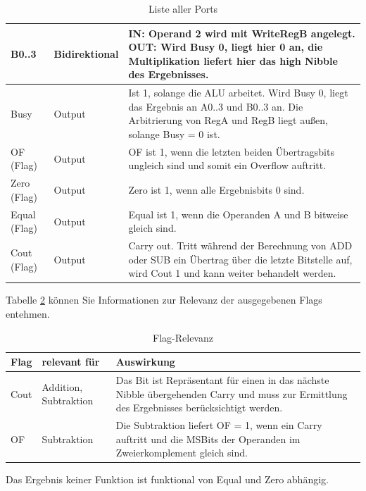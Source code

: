 \documentclass[11pt]{report}
\begin{document}
\begin{table}[h]
\begin{tabular}{|l|l|p{11cm}|}
			B0..3     & Bidirektional & IN: Operand 2 wird mit WriteRegB angelegt. OUT: Wird Busy 0, liegt hier 0 an, die Multiplikation liefert hier das high Nibble des Ergebnisses.                                                                 \\ \hline
			Busy      & Output        & Ist 1, solange die ALU arbeitet. Wird Busy 0, liegt das Ergebnis an A0..3 und B0..3 an. Die Arbitrierung von RegA und RegB liegt außen, solange Busy = 0 ist.                                                    \\ \hline
			OF (Flag)        & Output        & OF ist 1, wenn die letzten beiden Übertragsbits ungleich sind und somit ein Overflow auftritt.                                                                                                                 \\ \hline
			Zero (Flag)     & Output        & Zero ist 1, wenn alle Ergebnisbits 0 sind.                                                                                                                                                                     \\ \hline
			Equal (Flag)     & Output        & Equal ist 1, wenn die Operanden A und B bitweise gleich sind.                                                                                                                                                  \\ \hline
			Cout (Flag)      & Output        & Carry out. Tritt während der Berechnung von ADD oder SUB ein Übertrag über die letzte Bitstelle auf, wird Cout 1 und kann weiter behandelt werden.                                                             \\ \hline
		\end{tabular}
		\caption{Liste aller Ports} \label{portliste}
	\end{table}
	\FloatBarrier
	Tabelle \ref{flagtable} können Sie Informationen zur Relevanz der ausgegebenen Flags entehmen.\\
	
	\begin{table}[h]
		\centering
		\begin{tabular}{l|l|p{8cm}}
			Flag  & relevant für                       & Auswirkung   \\ \hline
			Cout  & Addition, Subtraktion              & Das Bit ist Repräsentant für einen in das nächste Nibble übergehenden Carry und muss zur Ermittlung des Ergebnisses berücksichtigt werden.\\
			OF    & Subtraktion                     & Die Subtraktion liefert OF = 1, wenn ein Carry auftritt und die MSBits der Operanden im Zweierkomplement gleich sind. \\
		\end{tabular}
		\caption{Flag-Relevanz} \label{flagtable}
	\end{table}
	\FloatBarrier
	Das Ergebnis keiner Funktion ist funktional von Equal und Zero abhängig.
	
\end{document}
